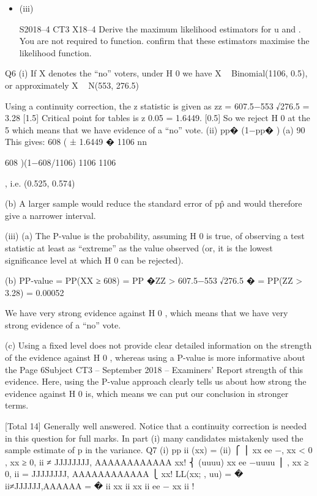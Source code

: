 \documentclass[a4paper,12pt]{article}
\begin{document}
\begin{enumerate}[(a)]
{\begin{itemize}
\item (iii)

S2018–4
CT3 X18–4
Derive the maximum likelihood estimators for u and \lambda. You are not required to
function.
confirm that these estimators maximise the likelihood function.
\end{itemize}

\newpage

Q6
(i)
If X denotes the “no” voters, under H 0 we have
X ~ Binomial(1106, 0.5), or approximately X ~ N(553, 276.5)

Using a continuity correction, the z statistic is given as
zz =
607.5−553
√276.5
= 3.28
[1.5]
Critical point for tables is z 0.05 = 1.6449.
[0.5]
So we reject H 0 at the 5%
which means that we have evidence of a “no” vote.
(ii)
pp� (1−pp� )
(a) 90%
This gives:
608
(
± 1.6449 �
1106
nn

608
)(1−608/1106)
1106
1106

, i.e. (0.525, 0.574)

(b) A larger sample would reduce the standard error of pp̂ and would therefore give a
narrower interval.

(iii)
(a) The P-value is the probability, assuming H 0 is true, of observing a test statistic at
least as “extreme” as the value observed (or, it is the lowest significance level at
which H 0 can be rejected).

(b) PP-value = PP(XX ≥ 608) = PP �ZZ >
607.5−553
√276.5
� = PP(ZZ > 3.28) = 0.00052

We have very strong evidence against H 0 , which means that we have very strong
evidence of a “no” vote.

(c) Using a fixed level does not provide clear detailed information on the strength of
the evidence against H 0 , whereas using a P-value is more informative about the
Page 6Subject CT3  – September 2018 – Examiners’ Report
strength of this evidence.
Here, using the P-value approach clearly tells us about how strong the evidence
against H 0 is, which means we can put our conclusion in stronger terms.

[Total 14]
Generally well answered. Notice that a continuity correction is needed
in this question for full marks. In part (i) many candidates mistakenly
used the sample estimate of p in the variance.
Q7
(i)
pp ii (xx) =
(ii)
⎧
⎪
\lambda\lambda xx ee −\lambda{}, xx < 0
, xx ≥ 0, ii ≠ JJJJJJJJ, AAAAAAAAAAAA
xx!
⎨ (uuuu) xx ee −uuuu
⎪
, xx ≥ 0, ii = JJJJJJJJ, AAAAAAAAAAAA
⎩ xx!
LL(xx; \lambda\lambda, uu) =
�
ii≠JJJJJJ,AAAAAA
= �
ii
xx ii
\lambda\lambda xx ii ee −\lambda\lambda
xx ii !


}
\end{enumerate}
\end{document}
